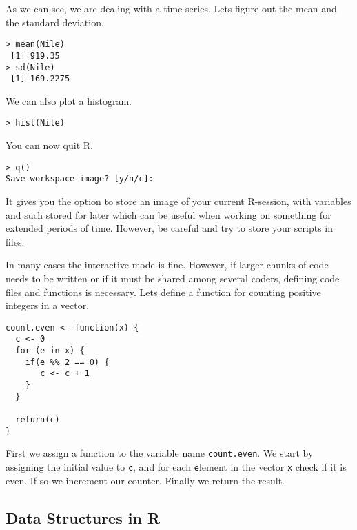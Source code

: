\documentclass{article}[11pt]
\begin{document}
As we can see, we are dealing with a time series. Lets figure out the
mean and the standard deviation.

\begin{verbatim}
> mean(Nile)
 [1] 919.35
> sd(Nile)
 [1] 169.2275
\end{verbatim}

We can also plot a histogram.

\begin{verbatim}
> hist(Nile)
\end{verbatim}

You can now quit R.

\begin{verbatim}
> q()
Save workspace image? [y/n/c]: 
\end{verbatim}

It gives you the option to store an image of your current R-session,
with variables and such stored for later which can be useful when
working on something for extended periods of time. However, be careful
and try to store your scripts in files.


In many cases the interactive mode is fine. However, if larger chunks
of code needs to be written or if it must be shared among several
coders, defining code files and functions is necessary. Lets define a
function for counting positive integers in a vector.


\begin{verbatim}
count.even <- function(x) {
  c <- 0
  for (e in x) {
    if(e %% 2 == 0) {
       c <- c + 1
    }
  }

  return(c)
}
\end{verbatim}

First we assign a function to the variable name
\texttt{count.even}. We start by assigning the initial value to
\texttt{c}, and for each \texttt{e}lement in the vector \texttt{x}
check if it is even. If so we increment our counter. Finally we return
the result.

\subsection*{Data Structures in R}
\end{document}
